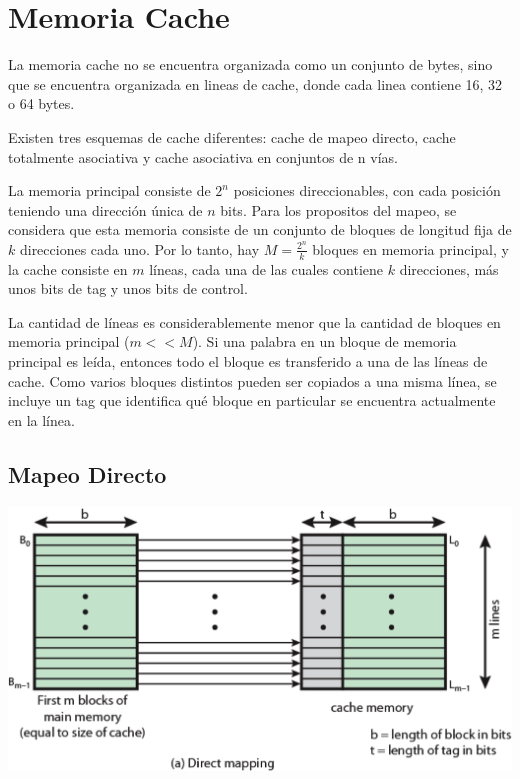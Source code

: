 \section{Memoria Cache}

La memoria cache no se encuentra organizada como un conjunto de bytes, sino que se encuentra organizada en lineas de cache, donde cada linea contiene
16, 32 o 64 bytes.

Existen tres esquemas de cache diferentes: cache de mapeo directo, cache totalmente asociativa y cache asociativa en conjuntos de n v\'ias.

La memoria principal consiste de $2^{n}$ posiciones direccionables, con cada posici\'on teniendo una direcci\'on \'unica de $n$ bits. Para los
propositos del mapeo, se considera que esta memoria consiste de un conjunto de bloques de longitud fija de $k$ direcciones cada uno. Por lo tanto, hay
$M = \frac{2^{n}}{k}$ bloques en memoria principal, y la cache consiste en $m$ l\'ineas, cada una de las cuales contiene $k$ direcciones, m\'as unos
bits de tag y unos bits de control.

La cantidad de l\'ineas es considerablemente menor que la cantidad de bloques en memoria principal ($m << M$). Si una palabra en un bloque
de memoria principal es le\'ida, entonces todo el bloque es transferido a una de las l\'ineas de cache. Como varios bloques distintos pueden
ser copiados a una misma l\'inea, se incluye un tag que identifica qu\'e bloque en particular se encuentra actualmente en la l\'inea.

\subsection{Mapeo Directo}

\begin{center}
\includegraphics[scale=0.4]{./Graficos/mapeo_directo.png} 
\end{center}

